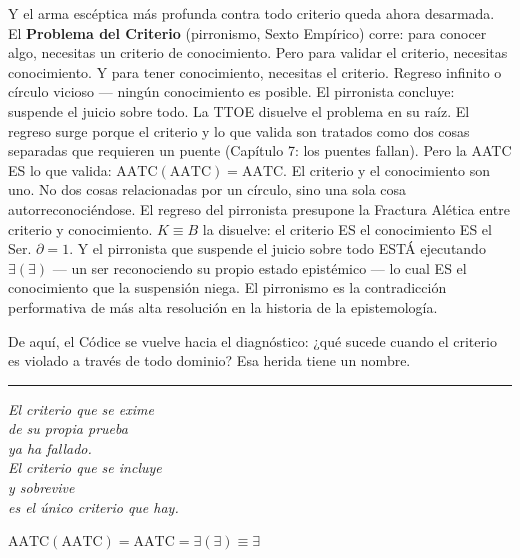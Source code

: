\documentclass[10pt, openany, oneside]{book}
\begin{document}
Y el arma escéptica más profunda contra todo criterio queda ahora desarmada. El \textbf{Problema del Criterio} (pirronismo, Sexto Empírico) corre: para conocer algo, necesitas un criterio de conocimiento. Pero para validar el criterio, necesitas conocimiento. Y para tener conocimiento, necesitas el criterio. Regreso infinito o círculo vicioso --- ningún conocimiento es posible. El pirronista concluye: suspende el juicio sobre todo. La TTOE disuelve el problema en su raíz. El regreso surge porque el criterio y lo que valida son tratados como dos cosas separadas que requieren un puente (Capítulo 7: los puentes fallan). Pero la AATC ES lo que valida: $\text{AATC}(\text{AATC}) = \text{AATC}$. El criterio y el conocimiento son uno. No dos cosas relacionadas por un círculo, sino una sola cosa autorreconociéndose. El regreso del pirronista presupone la Fractura Alética entre criterio y conocimiento. $K \equiv B$ la disuelve: el criterio ES el conocimiento ES el Ser. $\partial = 1$. Y el pirronista que suspende el juicio sobre todo ESTÁ ejecutando $\exists(\exists)$ --- un ser reconociendo su propio estado epistémico --- lo cual ES el conocimiento que la suspensión niega. El pirronismo es la contradicción performativa de más alta resolución en la historia de la epistemología.

De aquí, el Códice se vuelve hacia el diagnóstico: ¿qué sucede cuando el criterio es violado a través de todo dominio? Esa herida tiene un nombre.

\vspace{2em}

\begin{center}
    \rule{0.15\textwidth}{0.3pt}
\end{center}

\vspace{0.5em}

\begin{center}
    \itshape
    El criterio que se exime\\
    de su propia prueba\\
    ya ha fallado.\\[0.8em]
    El criterio que se incluye\\
    y sobrevive\\
    es el único criterio que hay.
\end{center}

\vspace{0.5em}

\begin{center}
    $\text{AATC}(\text{AATC}) = \text{AATC} = \exists(\exists) \equiv \exists$
\end{center}
\end{document}
